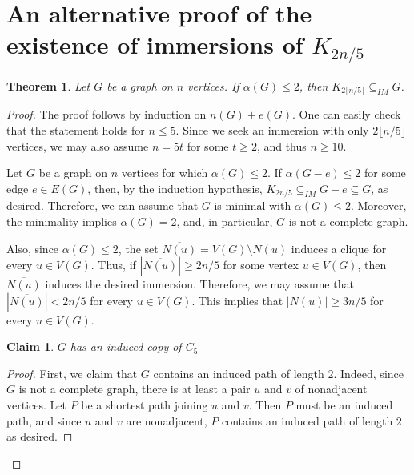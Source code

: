 \documentclass[a4paper,12pt]{article}
\newtheorem{theorem}{Theorem}
\newtheorem{claim}{Claim}[theorem]
\newcommand{\imm}{\subseteq_{IM}}
\begin{document}
\section{An alternative proof of the existence of immersions of $K_{2n/5}$}\label{sec:2/5}

\begin{theorem}
    Let \(G\) be a graph on \(n\) vertices.
    If $\alpha(G)\leq 2$, then $K_{2\lfloor n/5\rfloor}\imm G$.
\end{theorem}
\begin{proof}
    The proof follows by induction on \(n(G) + e(G)\).
    One can easily check that the statement holds for \(n\leq 5\).
    Since we seek an immersion with only $2\lfloor n/5\rfloor$ vertices, we may also assume $n=5t$ for some $t\geq2$, and thus \(n\geq 10\).

    Let \(G\) be a graph on \(n\) vertices for which \(\alpha(G) \leq 2\).
    If \(\alpha(G-e) \leq 2\) for some edge \(e\in E(G)\),
    then, by the induction hypothesis, \(K_{2n/5} \imm G-e \subseteq G\), as desired.
    Therefore, we can assume that \(G\) is minimal with \(\alpha(G) \leq 2\).
    Moreover, the minimality implies \(\alpha(G) = 2\),
    and, in particular, \(G\) is not a complete graph.

    Also,
    since $\alpha(G)\leq 2$, 
    the set $\overline{N(u)} = V(G)\setminus N(u)$ induces a clique for every $u\in V(G)$.
    Thus, if \(|\overline{N(u)}| \geq 2n/5\) for some vertex \(u\in V(G)\),
    then \(\overline{N(u)}\) induces the desired immersion.
    Therefore, we may assume that \(|\overline{N(u)}| < 2n/5\)
    for every \(u\in V(G)\).
    This implies that \(|N(u)| \geq 3n/5\) for every \(u\in V(G)\).
    


   
\begin{claim}
    \(G\) has an induced copy of \(C_5\)
\end{claim}
\begin{proof}
    First, we claim that \(G\) contains an induced path of length \(2\).
    Indeed,
    since \(G\) is not a complete graph, 
    there is at least a pair \(u\) and \(v\) of nonadjacent vertices.
    Let \(P\) be a shortest path joining \(u\) and \(v\).
    Then \(P\) must be an induced path, and since \(u\) and \(v\) are nonadjacent, \(P\) contains  an induced path of length \(2\) as desired.


\end{proof}
\end{proof}
\end{document}
